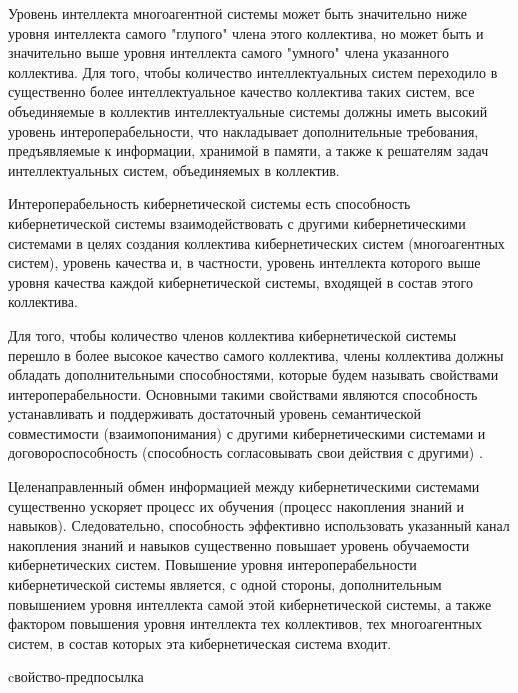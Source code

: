 Уровень интеллекта многоагентной системы может быть значительно ниже уровня интеллекта самого "глупого"{} члена этого коллектива, но может быть и значительно выше уровня интеллекта самого "умного"{} члена указанного коллектива.
Для того, чтобы количество интеллектуальных систем переходило в существенно более интеллектуальное качество коллектива таких систем, все объединяемые в коллектив интеллектуальные системы должны иметь высокий уровень интероперабельности, что накладывает дополнительные требования, предъявляемые к информации, хранимой в памяти, а также к решателям задач интеллектуальных систем, объединяемых в коллектив.

Интероперабельность кибернетической системы есть способность кибернетической системы взаимодействовать с другими кибернетическими системами в целях создания коллектива кибернетических систем (многоагентных систем), уровень качества и, в частности, уровень интеллекта которого выше уровня качества каждой кибернетической системы, входящей в состав этого коллектива.

Для того, чтобы количество членов коллектива кибернетической системы перешло в более высокое качество самого коллектива, члены коллектива должны обладать дополнительными способностями, которые будем называть свойствами интероперабельности.
Основными такими свойствами являются способность устанавливать и поддерживать достаточный уровень семантической совместимости (взаимопонимания) с другими кибернетическими системами и договороспособность (способность согласовывать свои действия с другими) \cite{NEIVA2016Interoperability}.

Целенаправленный обмен информацией между кибернетическими системами существенно ускоряет процесс их обучения (процесс накопления знаний и навыков).
Следовательно, способность эффективно использовать указанный канал накопления знаний и навыков существенно повышает уровень обучаемости кибернетических систем.
Повышение уровня интероперабельности кибернетической системы является, с одной стороны, дополнительным повышением уровня интеллекта самой этой кибернетической системы, а также фактором повышения уровня интеллекта тех коллективов, тех многоагентных систем, в состав которых эта кибернетическая система входит.

\begin{SCn}
\begin{scnrelfromlist}{cвойство-предпосылка}
\end{scnrelfromlist}
\end{SCn}

